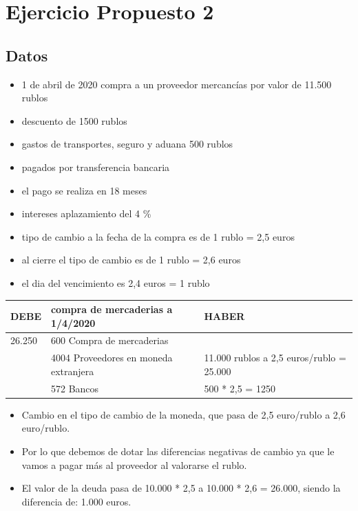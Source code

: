 \documentclass[a4paper,12pt]{article}
\begin{document}
\section{Ejercicio Propuesto 2}
\subsection*{Datos}
\begin{itemize}
    \item 1 de abril de 2020 compra a un proveedor mercancías por valor de 11.500 rublos
    \item descuento de 1500 rublos
    \item gastos de transportes, seguro y aduana 500 rublos
    \item pagados por transferencia bancaria
    \item el pago se realiza en 18 meses
    \item intereses aplazamiento del 4 \%
    \item tipo de cambio a la fecha de la compra es de 1 rublo = 2,5 euros
    \item al cierre el tipo de cambio es de 1 rublo = 2,6 euros
    \item el dia del vencimiento es 2,4 euros = 1 rublo
\end{itemize}

\begin{table}[H]
    \centering
    \begin{tabular}{|p{3cm}|p{6cm}|p{3cm}|}
    \hline
    \textbf{DEBE} & \textbf{compra de mercaderias a 1/4/2020} & \textbf{HABER} \\
    \hline
    26.250& 600 Compra de mercaderias& \\
    \hline
    & 4004 Proveedores en moneda extranjera& 11.000 rublos a 2,5 euros/rublo = 25.000\\
    \hline
    & 572 Bancos & 500 * 2,5 = 1250\\
    \hline
    \end{tabular}
\end{table}
\begin{itemize}
    \item Cambio en el tipo de cambio de la moneda, que pasa de 2,5 euro/rublo a 2,6 euro/rublo.
    \item Por lo que debemos de dotar las diferencias negativas de cambio ya que le vamos a pagar más al proveedor al valorarse el rublo.
    \item El valor de la deuda pasa de 10.000 * 2,5 a 10.000 * 2,6 = 26.000, siendo la diferencia de: 1.000 euros.
\end{itemize}
\end{document}
